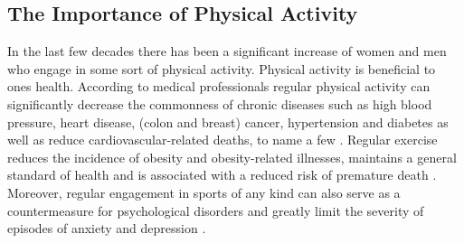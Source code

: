 \subsection{The Importance of Physical Activity}
In the last few decades there has been a significant increase of women and men who engage in some sort of physical activity. Physical activity is beneficial to ones health. According to medical professionals regular physical activity can significantly decrease the commonness of chronic diseases such as high blood pressure, heart disease,
(colon and breast) cancer, hypertension and diabetes as well as reduce cardiovascular-related deaths, to name a few \cite{mayr2015prevention, warburton2006health}. Regular exercise reduces the incidence of obesity
and obesity-related illnesses, maintains a general standard of health and is associated with a reduced risk of premature death \cite{warburton2006health}. Moreover, regular engagement in sports of any kind can also serve as a countermeasure for psychological disorders and greatly limit the severity of
episodes of anxiety and depression \cite{mayr2015prevention}.
